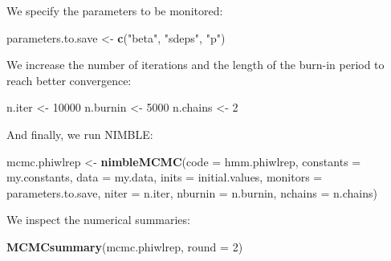 \documentclass[
  12pt,
]{krantz}
\newenvironment{Shaded}{\begin{snugshade}}{\end{snugshade}}
\newcommand{\AttributeTok}[1]{\textcolor[rgb]{0.13,0.29,0.53}{#1}}
\newcommand{\DecValTok}[1]{\textcolor[rgb]{0.00,0.00,0.81}{#1}}
\newcommand{\FunctionTok}[1]{\textcolor[rgb]{0.13,0.29,0.53}{\textbf{#1}}}
\newcommand{\NormalTok}[1]{#1}
\newcommand{\OtherTok}[1]{\textcolor[rgb]{0.56,0.35,0.01}{#1}}
\newcommand{\StringTok}[1]{\textcolor[rgb]{0.31,0.60,0.02}{#1}}
\begin{document}
We specify the parameters to be monitored:

\begin{Shaded}
\begin{Highlighting}[]
\NormalTok{parameters.to.save }\OtherTok{\textless{}{-}} \FunctionTok{c}\NormalTok{(}\StringTok{"beta"}\NormalTok{, }\StringTok{"sdeps"}\NormalTok{, }\StringTok{"p"}\NormalTok{)}
\end{Highlighting}
\end{Shaded}

We increase the number of iterations and the length of the burn-in period to reach better convergence:

\begin{Shaded}
\begin{Highlighting}[]
\NormalTok{n.iter }\OtherTok{\textless{}{-}} \DecValTok{10000}
\NormalTok{n.burnin }\OtherTok{\textless{}{-}} \DecValTok{5000}
\NormalTok{n.chains }\OtherTok{\textless{}{-}} \DecValTok{2}
\end{Highlighting}
\end{Shaded}

And finally, we run NIMBLE:

\begin{Shaded}
\begin{Highlighting}[]
\NormalTok{mcmc.phiwlrep }\OtherTok{\textless{}{-}} \FunctionTok{nimbleMCMC}\NormalTok{(}\AttributeTok{code =}\NormalTok{ hmm.phiwlrep, }
                            \AttributeTok{constants =}\NormalTok{ my.constants,}
                            \AttributeTok{data =}\NormalTok{ my.data,              }
                            \AttributeTok{inits =}\NormalTok{ initial.values,}
                            \AttributeTok{monitors =}\NormalTok{ parameters.to.save,}
                            \AttributeTok{niter =}\NormalTok{ n.iter,}
                            \AttributeTok{nburnin =}\NormalTok{ n.burnin, }
                            \AttributeTok{nchains =}\NormalTok{ n.chains)}
\end{Highlighting}
\end{Shaded}

We inspect the numerical summaries:

\begin{Shaded}
\begin{Highlighting}[]
\FunctionTok{MCMCsummary}\NormalTok{(mcmc.phiwlrep, }\AttributeTok{round =} \DecValTok{2}\NormalTok{)}
\end{Highlighting}
\end{Shaded}
\end{document}
